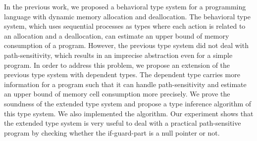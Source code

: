 \label{sec:abstraction}
In the previous work, we proposed a behavioral type system for a
programming language with dynamic memory allocation and deallocation.
The behavioral type system, which uses sequential processes as types
where each action is related to an allocation and a deallocation, can
estimate an upper bound of memory consumption of a program.  However,
the previous type system did not deal with path-sensitivity, which
results in an imprecise abstraction even for a simple program.  In
order to address this problem, we propose an extension of the previous
type system with dependent types.  The dependent type carries more
information for a program such that it can handle path-sensitivity and
estimate an upper bound of memory cell consumption more precisely.  We
prove the soundness of the extended type system and propose a type
inference algorithm of this type system.  We also implemented the
algorithm.  Our experiment shows that the extended type system is very
useful to deal with a practical path-sensitive program by checking
whether the if-guard-part is a null pointer or not.

